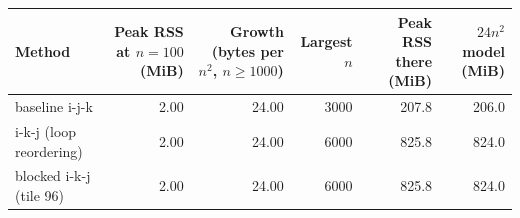 \begin{tabular}{lrrrrr}
\toprule
Method & Peak RSS at $n=100$ (MiB) & Growth (bytes per $n^2$, $n\ge1000$) & Largest $n$ & Peak RSS there (MiB) & $24n^2$ model (MiB) \\
\midrule
baseline i-j-k & 2.00 & 24.00 & 3000 & 207.8 & 206.0 \\
i-k-j (loop reordering) & 2.00 & 24.00 & 6000 & 825.8 & 824.0 \\
blocked i-k-j (tile 96) & 2.00 & 24.00 & 6000 & 825.8 & 824.0 \\
\bottomrule
\end{tabular}
